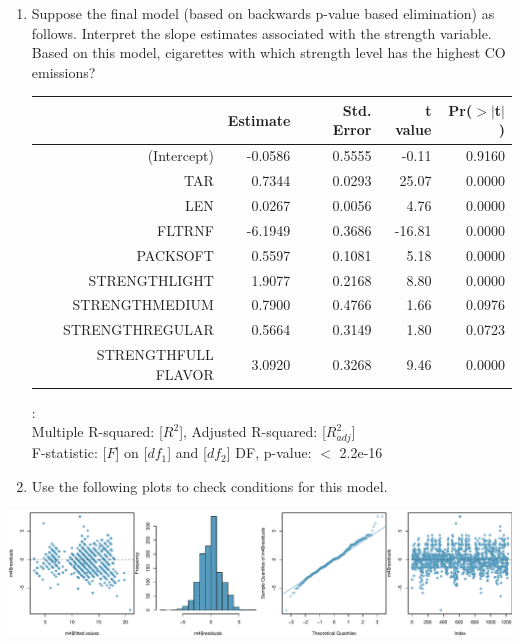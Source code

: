 \documentclass[11pt]{article}
\begin{document}
\begin{enumerate}
\item Suppose the final model (based on backwards p-value based elimination) as follows. Interpret the slope estimates associated with the strength variable. Based on this model, cigarettes with which strength level has the highest CO emissions?

{\small
\begin{center}
\begin{tabular}{rrrrr}
  \hline
 & Estimate & Std. Error & t value & Pr($>$$|$t$|$) \\ 
  \hline
(Intercept) & -0.0586 & 0.5555 & -0.11 & 0.9160 \\ 
  TAR & 0.7344 & 0.0293 & 25.07 & 0.0000 \\ 
  LEN & 0.0267 & 0.0056 & 4.76 & 0.0000 \\ 
  FLTRNF & -6.1949 & 0.3686 & -16.81 & 0.0000 \\ 
  PACKSOFT & 0.5597 & 0.1081 & 5.18 & 0.0000 \\ 
  STRENGTHLIGHT & 1.9077 & 0.2168 & 8.80 & 0.0000 \\ 
  STRENGTHMEDIUM & 0.7900 & 0.4766 & 1.66 & 0.0976 \\ 
  STRENGTHREGULAR & 0.5664 & 0.3149 & 1.80 & 0.0723 \\ 
  STRENGTHFULL FLAVOR & 3.0920 & 0.3268 & 9.46 & 0.0000 \\ 
   \hline
\end{tabular}
$:$ \\
Multiple R-squared:  \textcolor{custom_blue}{[$R^2$]},	Adjusted R-squared:  \textcolor{custom_blue}{[$R^2_{adj}$]} \\
F-statistic: \textcolor{custom_blue}{[$F$]} on \textcolor{custom_blue}{[$df_1$]} and \textcolor{custom_blue}{[$df_2$]} DF,  p-value: $<$ 2.2e-16
\end{center}
}

\item Use the following plots to check conditions for this model.

\end{enumerate}

\begin{center}
\includegraphics[width=\textwidth]{diag.pdf}
\end{center}
\end{document}
